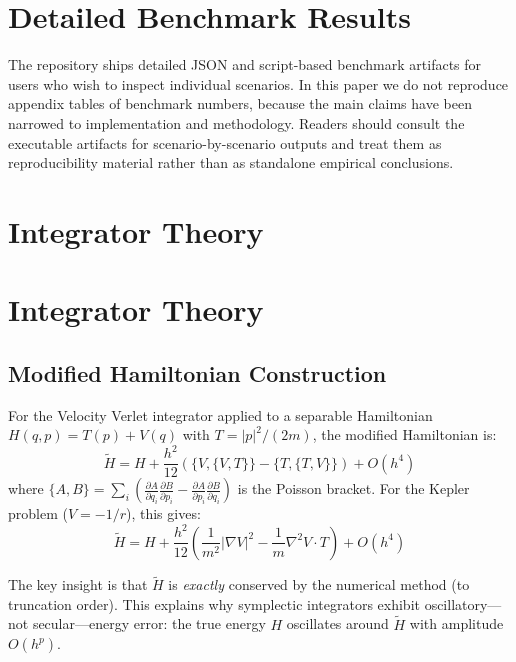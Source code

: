 \documentclass[11pt,a4paper]{article}
\begin{document}
\appendix

\appendix

\section{Detailed Benchmark Results}
\label{app:benchmarks}

The repository ships detailed JSON and script-based benchmark artifacts
for users who wish to inspect individual scenarios.  In this paper we
do not reproduce appendix tables of benchmark numbers, because the main
claims have been narrowed to implementation and methodology.  Readers
should consult the executable artifacts for scenario-by-scenario
outputs and treat them as reproducibility material rather than as
standalone empirical conclusions.

\section{Integrator Theory}

\section{Integrator Theory}
\label{app:integrator-theory}

\subsection{Modified Hamiltonian Construction}

For the Velocity Verlet integrator applied to a separable Hamiltonian $H(q, p) = T(p) + V(q)$ with $T = |p|^2/(2m)$, the modified Hamiltonian is:
\begin{equation}
    \tilde{H} = H + \frac{h^2}{12}\left(\{V, \{V, T\}\} - \{T, \{T, V\}\}\right) + O(h^4)
\end{equation}
where $\{A, B\} = \sum_i \left(\frac{\partial A}{\partial q_i}\frac{\partial B}{\partial p_i} - \frac{\partial A}{\partial p_i}\frac{\partial B}{\partial q_i}\right)$ is the Poisson bracket. For the Kepler problem ($V = -1/r$), this gives:
\begin{equation}
    \tilde{H} = H + \frac{h^2}{12}\left(\frac{1}{m^2}|\nabla V|^2 - \frac{1}{m}\nabla^2 V \cdot T\right) + O(h^4)
\end{equation}

The key insight is that $\tilde{H}$ is \emph{exactly} conserved by the numerical method (to truncation order). This explains why symplectic integrators exhibit oscillatory---not secular---energy error: the true energy $H$ oscillates around $\tilde{H}$ with amplitude $O(h^p)$.
\end{document}
